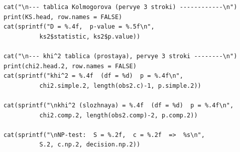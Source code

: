 \documentclass[areasetadvanced]{scrartcl}
\begin{document}
\begin{lstlisting}
cat("\n--- tablica Kolmogorova (pervye 3 stroki) ------------\n")
print(KS.head, row.names = FALSE)
cat(sprintf("D = %.4f,  p-value = %.5f\n",
          ks2$statistic, ks2$p.value))

cat("\n--- khi^2 tablica (prostaya), pervye 3 stroki --------\n")
print(chi2.head.2, row.names = FALSE)
cat(sprintf("khi^2 = %.4f  (df = %d)  p = %.4f\n",
          chi2.simple.2, length(obs2.c)-1, p.simple.2))

cat(sprintf("\nkhi^2 (slozhnaya) = %.4f  (df = %d)  p = %.4f\n",
          chi2.comp.2, length(obs2.comp)-2, p.comp.2))

cat(sprintf("\nNP-test:  S = %.2f,  c = %.2f  =>  %s\n",
          S.2, c.np.2, decision.np.2))
\end{lstlisting}
\end{document}

